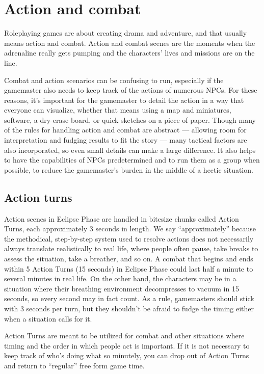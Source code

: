 
\chapter{Action and combat}
\label{chap:action-combat}

Roleplaying games are about creating drama and adventure, and that usually means action and combat. Action and combat scenes are the moments when the adrenaline really gets pumping and the characters’ lives and missions are on the line.

Combat and action scenarios can be confusing to run, especially if the gamemaster also needs to keep track of the actions of numerous NPCs. For these reasons, it’s important for the gamemaster to detail the action in a way that everyone can visualize, whether that means using a map and miniatures, software, a dry-erase board, or quick sketches on a piece of paper. Though many of the rules for handling action and combat are abstract --- allowing room for interpretation and fudging results to fit the story --- many tactical factors are also incorporated, so even small details can make a large difference. It also helps to have the capabilities of NPCs predetermined and to run them as a group when possible, to reduce the gamemaster’s burden in the middle of a hectic situation.


\section{Action turns}
\label{sec:combat-action-turns}

Action scenes in Eclipse Phase are handled in bitesize chunks called Action Turns, each approximately 3 seconds in length. We say ``approximately'' because the methodical, step-by-step system used to resolve actions does not necessarily always translate realistically to real life, where people often pause, take breaks to assess the situation, take a breather, and so on. A combat that begins and ends within 5 Action Turns (15 seconds) in Eclipse Phase could last half a minute to several minutes in real life. On the other hand, the characters may be in a situation where their breathing environment decompresses to vacuum in 15 seconds, so every second may in fact count. As a rule, gamemasters should stick with 3 seconds per turn, but they shouldn’t be afraid to fudge the timing either when a situation calls for it.

Action Turns are meant to be utilized for combat and other situations where timing and the order in which people act is important. If it is not necessary to keep track of who’s doing what so minutely, you can drop out of Action Turns and return to ``regular'' free form game time.

